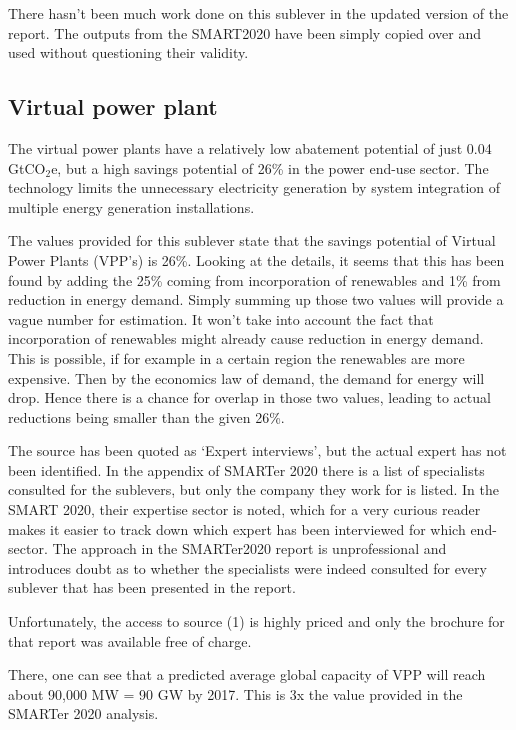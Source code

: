 There hasn’t been much work done on this sublever in the updated version of the report. The outputs from the SMART2020 have been simply copied over and used without questioning their validity. 




\subsection{Virtual power plant}

The virtual power plants have a relatively low abatement potential of just 0.04 GtCO$_2$e, but a high savings potential of 26\% in the power end-use sector. The technology limits the unnecessary electricity generation by system integration of multiple energy generation installations.

The values provided for this sublever state that the savings potential of Virtual Power Plants (VPP’s) is 26\%. Looking at the details, it seems that this has been found by adding the 25\% coming from incorporation of renewables and 1\% from reduction in energy demand. Simply summing up those two values will provide a vague number for estimation. It won’t take into account the fact that incorporation of renewables might already cause reduction in energy demand. This is possible, if for example in a certain region the renewables are more expensive. Then by the economics law of demand, the demand for energy will drop. Hence there is a chance for overlap in those two values, leading to actual reductions being smaller than the given 26\%.

The source has been quoted as ‘Expert interviews’, but the actual expert has not been identified. In the appendix of SMARTer 2020 there is a list of specialists consulted for the sublevers, but only the company they work for is listed. In the SMART 2020, their expertise sector is noted, which for a very curious reader makes it easier to track down which expert has been interviewed for which end-sector. The approach in the SMARTer2020 report is unprofessional and introduces doubt as to whether the specialists were indeed consulted for every sublever that has been presented in the report.

Unfortunately, the access to source (1) is highly priced and only the brochure for that report was available free of charge. %

There, one can see that a predicted average global capacity of VPP will reach about 90,000 MW = 90 GW by 2017. This is 3x the value provided in the SMARTer 2020 analysis. 

